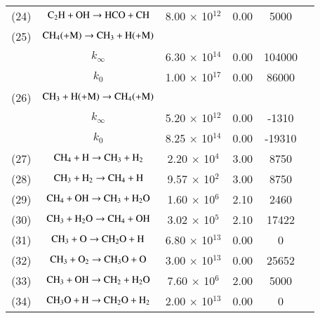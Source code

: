 \documentclass{warpdoc}
\begin{document}
\begin{table}[h]
\begin{center}
\begin{threeparttable}
\begin{tabular}{cccccc}
(24) & $\rm C_2 H + OH \rightarrow HCO + CH $ &8.00 $\times$ 10$^{12}$  & 0.00 &5000 &\cite{ef:2017:zettervall}\\

(25) & $\rm C H_4 (+M) \rightarrow CH_3 + H (+M) $  &  &  &  & \cite{rkm:1991:smoke}\\

  & $k_\infty $ & 6.30 $\times$ 10$^{14}$ &0.00  &104000  &\\

  & $k_{0} $ & 1.00 $\times$ 10$^{17}$ & 0.00 & 86000 &\\
  
(26) & $\rm CH_3 + H (+M)  \rightarrow C H_4 (+M) $&  &  &  &\cite{rkm:1991:smoke}\\

  & $k_\infty $ & 5.20 $\times$ 10$^{12}$ &0.00  &-1310  &\\

  & $k_{0} $ & 8.25 $\times$ 10$^{14}$ & 0.00 & -19310 &\\
  
(27) & $\rm C H_4 + H \rightarrow C H_3 + H_2 $ &2.20 $\times$ 10$^{4}$  & 3.00 &8750 &\cite{rkm:1991:smoke}\\  

(28) & $\rm C H_3 + H_2 \rightarrow C H_4 + H $ &9.57 $\times$ 10$^{2}$  & 3.00 &8750 &\cite{rkm:1991:smoke}\\ 

(29) & $\rm C H_4 + OH \rightarrow C H_3 + H_2 O $ &1.60 $\times$ 10$^{6}$  & 2.10 &2460 &\cite{rkm:1991:smoke}\\ 

(30) & $\rm C H_3 + H_2 O \rightarrow C H_4 + OH $ &3.02 $\times$ 10$^{5}$  & 2.10 &17422 &\cite{rkm:1991:smoke}\\ 

(31) & $\rm C H_3 + O \rightarrow C H_2 O + H $ &6.80 $\times$ 10$^{13}$  & 0.00 &0 &\cite{rkm:1991:smoke}\\ 

(32) & $\rm C H_3 + O_2 \rightarrow C H_3 O + O $ &3.00 $\times$ 10$^{13}$  & 0.00 &25652 &\cite{rkm:1991:smoke}\\ 

(33) & $\rm C H_3 + OH \rightarrow C H_2  + H_2 O $ &7.60 $\times$ 10$^{6}$  & 2.00 &5000 &\cite{comb:2010:glassman}\\

(34) & $\rm C H_3 O + H \rightarrow C H_2 O  + H_2 $ &2.00 $\times$ 10$^{13}$  & 0.00 &0 &\cite{rkm:1991:smoke}\\ 


\end{tabular}
\end{threeparttable}
\end{center}
\end{table}
\end{document}
